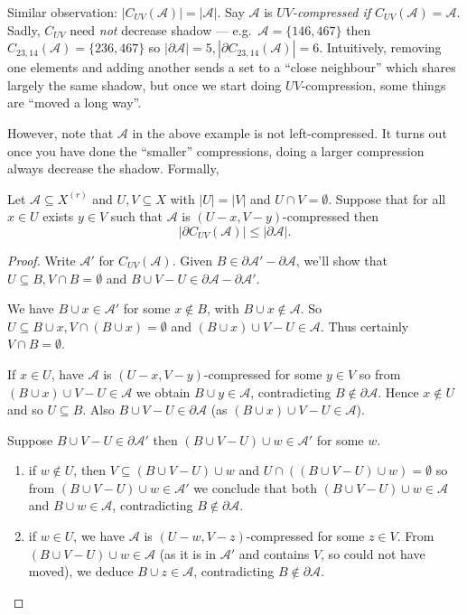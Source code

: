 \documentclass[a4paper]{article}
\newcommand{\shadow}{\partial}
\begin{document}
Similar observation: \(|C_{UV}(\mathcal A)| = |\mathcal A|\). Say \(\mathcal A\) is \emph{\(UV\)-compressed if \(C_{UV}(\mathcal A) =\mathcal A\)}. Sadly, \(C_{UV}\) need \emph{not} decrease shadow --- e.g.\ \(\mathcal A = \{146, 467\}\) then \(C_{23, 14}(\mathcal A) = \{236, 467\}\) so \(|\shadow \mathcal A| = 5, |\shadow C_{23, 14}(\mathcal A)| = 6\). Intuitively, removing one elements and adding another sends a set to a ``close neighbour'' which shares largely the same shadow, but once we start doing \(UV\)-compression, some things are ``moved a long way''.

However, note that \(\mathcal A\) in the above example is not left-compressed. It turns out once you have done the ``smaller'' compressions, doing a larger compression always decrease the shadow. Formally,

\begin{proposition}
  \label{prop:UV-compression}
  Let \(\mathcal A \subseteq X^{(r)}\) and \(U,V \subseteq X\) with \(|U| = |V|\) and \(U \cap V = \emptyset\). Suppose that for all \(x \in U\) exists \(y \in V\) such that \(\mathcal A\) is \((U - x, V - y)\)-compressed then
  \[
    |\shadow C_{UV}(\mathcal A)| \leq |\shadow \mathcal A|.
  \]
\end{proposition}

\begin{proof}
  Write \(\mathcal A'\) for \(C_{UV}(\mathcal A)\). Given \(B \in \shadow \mathcal A' - \shadow \mathcal A\), we'll show that \(U \subseteq B, V \cap B = \emptyset\) and \(B \cup V - U \in \shadow \mathcal A - \shadow \mathcal A'\).

  We have \(B \cup x \in \mathcal A'\) for some \(x \notin B\), with \(B \cup x \notin \mathcal A\). So \(U \subseteq B \cup x, V \cap (B \cup x) = \emptyset\) and \((B \cup x) \cup V - U \in \mathcal A\). Thus certainly \(V \cap B = \emptyset\).

  If \(x \in U\), have \(\mathcal A\) is \((U - x, V - y)\)-compressed for some \(y \in V\) so from \((B \cup x) \cup V - U \in \mathcal A\) we obtain \(B \cup y \in \mathcal A\), contradicting \(B \notin \shadow \mathcal A\). Hence \(x \notin U\) and so \(U \subseteq B\). Also \(B \cup V - U \in \shadow \mathcal A\) (as \((B \cup x) \cup V - U \in \mathcal A\)).

  Suppose \(B \cup V - U \in \shadow \mathcal A'\) then \((B \cup V - U) \cup w \in \mathcal A'\) for some \(w\).
  \begin{enumerate}
  \item if \(w \notin U\), then \(V \subseteq (B \cup V - U) \cup w\) and \(U \cap ((B \cup V - U) \cup w) = \emptyset\) so from \((B \cup V - U) \cup w \in \mathcal A'\) we conclude that both \((B \cup V - U) \cup w \in \mathcal A\) and \(B \cup w \in \mathcal A\), contradicting \(B \notin \shadow \mathcal A\).
  \item if \(w \in U\), we have \(\mathcal A\) is \((U - w, V - z)\)-compressed for some \(z \in V\). From \((B \cup V - U) \cup w \in \mathcal A\) (as it is in \(\mathcal A'\) and contains \(V\), so could not have moved), we deduce \(B \cup z \in \mathcal A\), contradicting \(B \notin \shadow \mathcal A\).
  \end{enumerate}
\end{proof}
\end{document}
